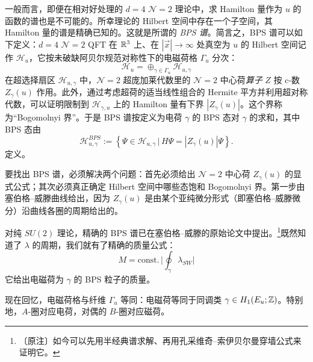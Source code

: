 一般而言，即便在相对好处理的 $d=4$ $\mathcal{N}=2$ 理论中，求 Hamilton 量作为 $u$ 的函数的谱也是不可能的。所幸理论的 Hilbert 空间中存在一个子空间，其 Hamilton 量的谱是精确已知的。这就是所谓的 \emph{BPS 谱}。简言之，BPS 谱可以如下定义：$d=4$ $\mathcal{N}=2$ QFT 在 $\mathbb{R}^{3}$ 上、在 $|\vec x|\to\infty$ 处真空为 $u$ 的 Hilbert 空间记作 $\mathcal{H}_{u}$，它按未破缺阿贝尔规范对称性下的电磁荷格 $\Gamma_{u}$ 分次：
\begin{equation}
\mathcal{H}_{u}=\oplus_{\gamma\in\Gamma_{u}}\mathcal{H}_{u,\gamma}
\tag{5.46}
\end{equation}
在超选择扇区 $\mathcal{H}_{u,\gamma}$ 中，$\mathcal{N}=2$ 超庞加莱代数里的 $\mathcal{N}=2$ 中心荷\emph{算子} $Z$ 按 c-数 $Z_{\gamma}(u)$ 作用。此外，通过考虑超荷的适当线性组合的 Hermite 平方并利用超对称代数，可以证明限制到 $\mathcal{H}_{\gamma,u}$ 上的 Hamilton 量有下界 $|Z_{\gamma}(u)|$。这个界称为“Bogomolnyi 界”。于是 BPS 谱按定义为电荷 $\gamma$ 的 BPS 态对 $\gamma$ 的求和，其中 BPS 态由
\begin{equation}
\mathcal{H}^{BPS}_{u,\gamma}:=\left\{\Psi\in\mathcal{H}_{u,\gamma}\,\big|\,H\Psi=|Z_{\gamma}(u)|\Psi\right\}.
\tag{5.47}
\end{equation}
定义。

要找出 BPS 谱，必须解决两个问题：首先必须给出 $\mathcal{N}=2$ 中心荷 $Z_{\gamma}(u)$ 的显式公式；其次必须真正确定 Hilbert 空间中哪些态饱和 Bogomolnyi 界。第一步由塞伯格--威滕曲线给出，因为 $Z_{\gamma}(u)$ 是由某个亚纯微分形式（即塞伯格--威滕微分）沿曲线各圈的周期给出的。

对纯 $SU(2)$ 理论，精确的 BPS 谱已在塞伯格--威滕的原始论文中提出。\footnote{〔原注〕如今可以先用半经典谱求解、再用孔采维奇--索伊贝尔曼穿墙公式来证明它。}既然知道了 $\lambda$ 的周期，我们就有了精确的质量公式：
\begin{equation}
M=\text{const.}\,\Big|\oint_{\gamma}\lambda_{SW}\Big|
\tag{5.48}
\end{equation}
它给出电磁荷为 $\gamma$ 的 BPS 粒子的质量。

现在回忆，电磁荷格与纤维 $\Gamma_{u}$ 等同：电磁荷等同于同调类 $\gamma\in H_{1}(E_{u};\mathbb{Z})$。特别地，$A$-圈对应电荷，对偶的 $B$-圈对应磁荷。


